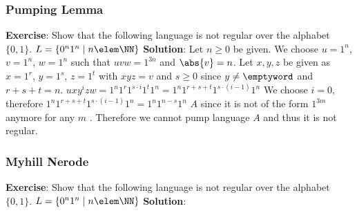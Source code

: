 \documentclass[10pt,a4paper,english]{article}
\begin{document}


    \newpage
    
    \subsubsection{Pumping Lemma}
    \textbf{Exercise}:\newline
    Show that the following language is not regular over the alphabet $ \{0,1\} $.\newline
    $L=\{0^n 1^n \mid n \elem \NN \}$\newline\newline
    \textbf{Solution}:\newline
    Let $n \geq 0$ be given.\newline
    We choose $u=1^n$, $v=1^n$, $w=1^n$ such that $uvw=1^{3n}$ and $\abs{v}=n$.\newline
    Let $x,y,z$ be given as $x=1^r$, $y=1^s$, $z=1^t$ with $xyz=v$ and $s \ge 0$ since $y \neq \emptyword$ and $r+s+t=n$.\newline
    $uxy^izw=1^n 1^r 1^{s \cdot i} 1^t 1^n=1^n 1^{r+s+t} 1^{s \cdot (i-1)} 1^n$\newline
    We choose $i=0$, therefore $1^n 1^{r+s+t} 1^{s \cdot (i-1)} 1^n = 1^n 1^{n-s} 1^n$ \notelem $A$ since it is not of the form $1^{3m}$ anymore for any $m$ \elem \NN.\newline
    Therefore we cannot pump language $A$ and thus it is not regular.\newline


    \subsubsection{Myhill Nerode}
    \textbf{Exercise}:\newline
    Show that the following language is not regular over the alphabet $ \{0,1\} $.\newline
    $L=\{0^n 1^n \mid n \elem \NN \}$\newline\newline
    \textbf{Solution}:\newline

    \newpage
    \printindex
\end{document}
